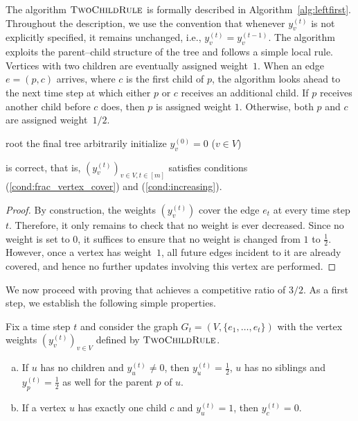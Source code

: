 \documentclass[a4paper,USenglish,cleveref,autoref,thm-restate,pdfa]{lipics-v2021}
\begin{document}
The algorithm $\twochild$ is formally described in Algorithm~\ref{alg:leftfirst}. Throughout the description, we use the convention that whenever $y_v^{(t)}$ is not explicitly specified, it remains unchanged, i.e., $y_v^{(t)} = y_v^{(t-1)}$.
The algorithm exploits the parent--child structure of the tree and follows a simple local rule. Vertices with two children are eventually assigned weight~$1$. When an edge $e=(p,c)$ arrives, where $c$ is the first child of $p$, the algorithm looks ahead to the next time step at which either $p$ or $c$ receives an additional child. If $p$ receives another child before $c$ does, then $p$ is assigned weight $1$. Otherwise, both $p$ and $c$ are assigned weight~$1/2$.


\begin{algorithm}
\setcounter{AlgoLine}{0}
\caption{$\twochild$}
\label{alg:leftfirst}
root the final tree arbitrarily\;
initialize $y_v^{(0)}=0$ ($v\in V$)\;
\end{algorithm}

\begin{observation}
\twochild is correct, that is, $(y_v^{(t)})_{v\in V, t \in [m]}$ satisfies conditions (\ref{cond:frac_vertex_cover}) and (\ref{cond:increasing}).
\end{observation}

\begin{proof}
By construction, the weights $(y_v^{(t)})$ cover the edge $e_t$ at every time step $t$.
Therefore, it only remains to check that no weight is ever decreased.
Since no weight is set to $0$, it suffices to ensure that no weight is changed from $1$ to $\frac12$.
  However, once a vertex has weight~$1$, all future edges incident to it are already covered, and hence no further updates involving this vertex are performed.
\end{proof}

We now proceed with proving that \twochild achieves a competitive ratio of $3/2$.
As a first step, we establish the following simple properties.

\begin{observation}\label{obs:upper_bound}
Fix a time step $t$ and consider the graph $G_t=(V, \{e_1, \dots, e_t\})$ with the vertex weights $(y_v^{(t)})_{v\in V}$ defined by $\twochild$.
\begin{enumerate}[(a)]
  \item If $u$ has no children and $y_u^{(t)} \neq 0$, then $y_u^{(t)}=\frac12$, $u$ has no siblings and $y_p^{(t)}=\frac12$ as well for the parent $p$ of $u$.\label{obs:leaf}
    \item If a vertex $u$ has exactly one child $c$ and $y_u^{(t)}=1$, then $y_c^{(t)}=0$.\label{obs:one_child}
\end{enumerate}
\end{observation}
\end{document}
